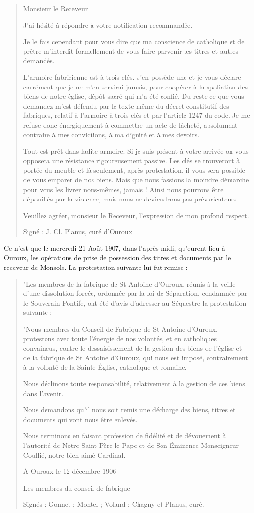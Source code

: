 \begin{quote}
Monsieur le Receveur

J'ai hésité à répondre à votre notification recommandée.

Je le fais cependant pour vous dire que ma conscience de catholique et de prêtre m'interdit formellement de vous faire parvenir les titres et autres demandés.

L'armoire fabricienne est à trois clés. J'en possède une et je vous déclare carrément que je ne m'en servirai jamais, pour coopérer à la spoliation des biens de notre église, dépôt sacré qui m'a été confié. Du reste ce que vous demandez m'est défendu par le texte même du décret constitutif des fabriques, relatif à l'armoire à trois clés et par l'article 1247 du code. Je me refuse donc énergiquement à commettre un acte de lâcheté, absolument contraire à mes convictions, à ma dignité et à mes devoirs.

Tout est prêt dans ladite armoire. Si je suis présent à votre arrivée on vous opposera une résistance rigoureusement passive. Les clés se trouveront à portée du meuble et là seulement, après protestation, il vous sera possible de vous emparer de nos biens. Mais que nous fassions la moindre démarche pour vous les livrer nous-mêmes, jamais ! Ainsi nous pourrons être dépouillés par la violence, mais nous ne deviendrons pas prévaricateurs.

Veuillez agréer, monsieur le Receveur, l'expression de mon profond respect.

Signé : J. Cl. Planus, curé d'Ouroux
\end{quote}
Ce n'est que le mercredi 21 Août 1907, dans l'après-midi, qu'eurent lieu à Ouroux, les opérations de prise de possession des titres et documents par le receveur de Monsols. La protestation suivante lui fut remise :
\begin{quote}
"Les membres de la fabrique de St-Antoine d'Ouroux, réunis à la veille d'une dissolution forcée, ordonnée par la loi de Séparation, condamnée par le Souverain Pontife, ont été d'avis d'adresser au Séquestre la protestation suivante :

"Nous membres du Conseil de Fabrique de St Antoine d'Ouroux, protestons avec toute l'énergie de nos volontés, et en catholiques convaincus, contre le dessaisissement de la gestion des biens de l'église et de la fabrique de St Antoine d'Ouroux, qui nous est imposé, contrairement à la volonté de la Sainte Église, catholique et romaine.

Nous déclinons toute responsabilité, relativement à la gestion de ces biens dans l'avenir.

Nous demandons qu'il nous soit remis une décharge des biens, titres et documents qui vont nous être enlevés.

Nous terminons en faisant profession de fidélité et de dévouement à l'autorité de Notre Saint-Père le Pape et de Son Éminence Monseigneur Coullié, notre bien-aimé Cardinal.

À Ouroux le 12 décembre 1906

Les membres du conseil de fabrique

Signés : Gonnet ; Montel ; Voland ; Chagny et Planus, curé.
\end{quote}
